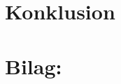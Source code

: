 \documentclass[12pt, a4paper]{article}
\begin{document}
        \pagebreak
        \pagestyle{fancy}

        
        \section{Konklusion}

        
        

        \section{Bilag:}
\end{document}

